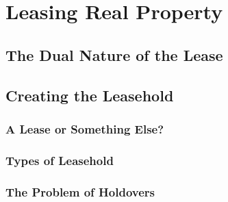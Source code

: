 \chapter{Leasing Real Property}




\section{The Dual Nature of the Lease}







\section{Creating the Leasehold}



\subsection{A Lease or Something Else?}




\subsection{Types of Leasehold}






\begin{questions}

\end{questions}





\subsection{The Problem of Holdovers}



\begin{questions}

\end{questions}







\begin{questions}

\end{questions}



